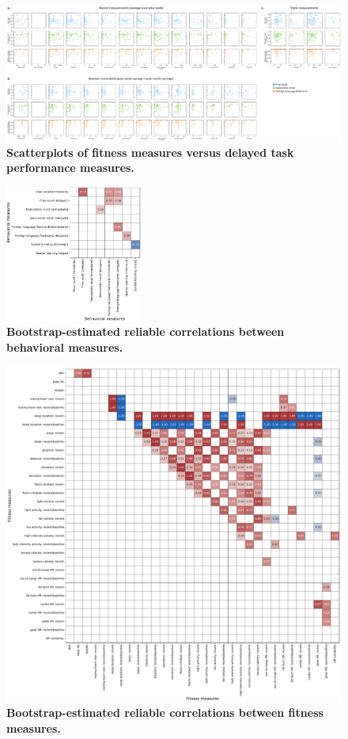 \documentclass[10pt]{article}
\begin{document}
\begin{figure}
\centering
\includegraphics[width=\textwidth]{figs/fitness_scatter_delayed}
\caption{\textbf{Scatterplots of fitness measures versus
    delayed task performance measures.}}
\label{fig:fitness_scatters_delayed}
\end{figure}

\begin{figure}[p]
\centering
\includegraphics[width=0.4\textwidth]{figs/behavior_behavior_correlations}
\caption{\textbf{Bootstrap-estimated reliable correlations between
    behavioral measures.}}
\label{fig:behavioral_corrs}
\end{figure}

\begin{figure}[p]
\centering
\includegraphics[width=\textwidth]{figs/fitness_fitness_correlations}
\caption{\textbf{Bootstrap-estimated reliable correlations between
    fitness measures.}}
\label{fig:fitness_corrs}
\end{figure}
\end{document}
